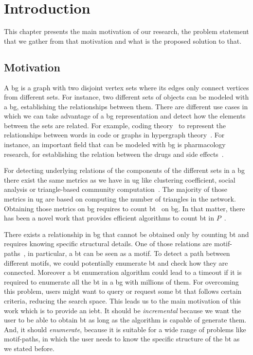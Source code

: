 \chapter{Introduction}\label{intro}
This chapter presents the main motivation of our research, the problem statement that we gather from that motivation
and what is the proposed solution to that.

\section{Motivation}\label{sec:motivation}
A \acrfull{bg} is a graph with two disjoint vertex sets where its edges only connect vertices from different sets. 
For instance, two different sets of objects can be modeled with a \acrshort{bg}, establishing the relationships between them.
There are different use cases in which we can take advantage of a \acrshort{bg} representation and detect how the elements between the sets
are related. For example, coding theory~\cite{DBLP:journals/corr/WangL13} to represent the relationships between words in code or graphs in hypergraph theory~\cite{hypergraph}. 
For instance, an important field that can be modeled with \acrshort{bg} is pharmacology research, for establishing the relation between the drugs and side effects~\cite{drugs}.

For detecting underlying relations of the components of the different sets in a \acrshort{bg} there exist the same metrics as we have in \acrfull{ug} like clustering coefficient, social analysis or triangle-based community computation~\cite{ccoef,detect_graph,Newman_2003}.
The majority of those metrics in \acrshort{ug} are based on computing the number of triangles in the network. Obtaining those metrics on \acrshort{bg} requires to count \acrfull{bt}~\cite{opsahl} on \acrshort{bg}.
In that matter, there has been a novel work that provides efficient algorithms to count \acrshort{bt} in $P$~\cite{btcount}.

There exists a relationship in \acrshort{bg} that cannot be obtained only by counting \acrshort{bt} and requires knowing specific
structural details. One of those relations are motif-paths~\cite{Li2019MotifPA}, in particular, a \acrshort{bt} can be seen as a motif. To detect a path between different motifs, we could potentially enumerate \acrshort{bt} and check how they are connected.
Moreover a \acrshort{bt} enumeration algorithm could lead to a timeout if it is required to enumerate all the \acrshort{bt} in a \acrshort{bg} with millions of them. For overcoming this problem, users might want to query or request some \acrshort{bt} that follows certain criteria, reducing the search space. 
This leads us to the main motivation of this work which is to provide an \acrfull{iebt}. It should be \emph{incremental} because we want the user to be able to obtain \acrshort{bt} as long as the algorithm is capable of generate them. 
And, it should \emph{enumerate}, because it is suitable for a wide range of problems like motif-paths, in which the user needs to know the specific structure of the \acrshort{bt} as we stated before.

